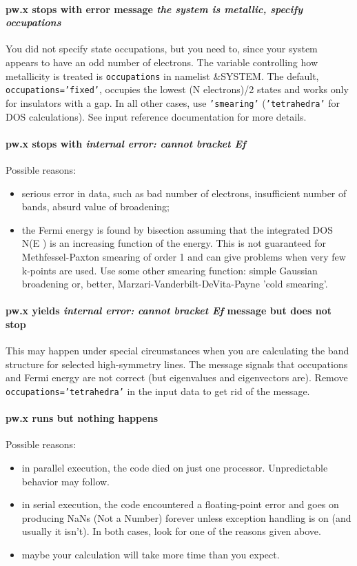 \documentclass[12pt,a4paper]{article}
\begin{document}
\paragraph{pw.x stops with error message {\em the system is metallic,
 specify occupations}} 
You did not specify state occupations, but you need to, since your
system appears to have an odd number of electrons. The variable
controlling how metallicity is treated is \texttt{occupations} in namelist
\&SYSTEM. The default, \texttt{occupations='fixed'}, occupies the lowest
(N electrons)/2 states and works only for insulators with a gap. In all other
cases, use \texttt{'smearing'} (\texttt{'tetrahedra'} for DOS calculations). 
See input reference documentation for more details.

\paragraph{pw.x stops with {\em internal error: cannot bracket Ef}}
Possible reasons:
\begin{itemize}
\item serious error in data, such as bad number of electrons,
  insufficient number of bands, absurd value of broadening; 
\item the Fermi energy is found by bisection assuming that the
  integrated DOS N(E ) is an increasing function of the energy. This
  is not guaranteed for Methfessel-Paxton smearing of order 1 and can
  give problems when very few k-points are used. Use some other
  smearing function: simple Gaussian broadening or, better,
  Marzari-Vanderbilt-DeVita-Payne 'cold smearing'. 
\end{itemize}

\paragraph{pw.x yields {\em internal error: cannot bracket Ef} message 
but does not stop} 
This may happen under special circumstances when you are calculating
the band structure for selected high-symmetry lines. The message
signals that occupations and Fermi energy are not correct (but
eigenvalues and eigenvectors are). Remove \texttt{occupations='tetrahedra'}
in the input data to get rid of the message. 

\paragraph{pw.x runs but nothing happens}
Possible reasons:
\begin{itemize}
\item in parallel execution, the code died on just one
  processor. Unpredictable behavior may follow. 
\item in serial execution, the code encountered a floating-point error
  and goes on producing NaNs (Not a Number) forever unless exception
  handling is on (and usually it isn't). In both cases, look for one
  of the reasons given above. 
\item maybe your calculation will take more time than you expect.
\end{itemize}
\end{document}
